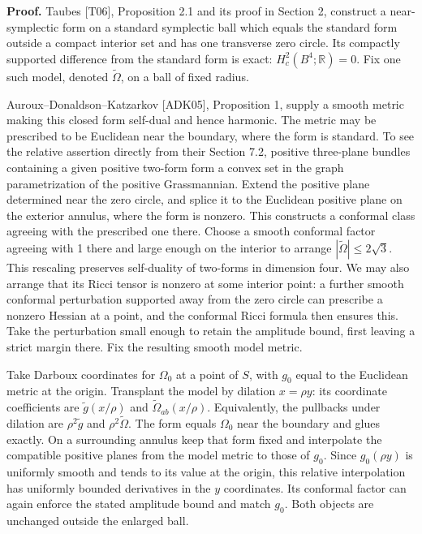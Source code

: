 \documentclass[
  11pt,
]{article}
\begin{document}
\textbf{Proof.} Taubes {[}T06{]}, Proposition 2.1 and its proof in
Section 2, construct a near-symplectic form on a standard symplectic
ball which equals the standard form outside a compact interior set and
has one transverse zero circle. Its compactly supported difference from
the standard form is exact: \(H_c^2(B^4;\mathbb R)=0\). Fix one such
model, denoted \(\widetilde\Omega\), on a ball of fixed radius.

Auroux--Donaldson--Katzarkov {[}ADK05{]}, Proposition 1, supply a smooth
metric making this closed form self-dual and hence harmonic. The metric
may be prescribed to be Euclidean near the boundary, where the form is
standard. To see the relative assertion directly from their Section 7.2,
positive three-plane bundles containing a given positive two-form form a
convex set in the graph parametrization of the positive Grassmannian.
Extend the positive plane determined near the zero circle, and splice it
to the Euclidean positive plane on the exterior annulus, where the form
is nonzero. This constructs a conformal class agreeing with the
prescribed one there. Choose a smooth conformal factor agreeing with 1
there and large enough on the interior to arrange
\(|\widetilde\Omega|\le2\sqrt3\). This rescaling preserves self-duality
of two-forms in dimension four. We may also arrange that its Ricci
tensor is nonzero at some interior point: a further smooth conformal
perturbation supported away from the zero circle can prescribe a nonzero
Hessian at a point, and the conformal Ricci formula then ensures this.
Take the perturbation small enough to retain the amplitude bound, first
leaving a strict margin there. Fix the resulting smooth model metric.

Take Darboux coordinates for \(\Omega_0\) at a point of \(S\), with
\(g_0\) equal to the Euclidean metric at the origin. Transplant the
model by dilation \(x=\rho y\): its coordinate coefficients are
\(\widetilde g(x/\rho)\) and \(\widetilde\Omega_{ab}(x/\rho)\).
Equivalently, the pullbacks under dilation are \(\rho^2\widetilde g\)
and \(\rho^2\widetilde\Omega\). The form equals \(\Omega_0\) near the
boundary and glues exactly. On a surrounding annulus keep that form
fixed and interpolate the compatible positive planes from the model
metric to those of \(g_0\). Since \(g_0(\rho y)\) is uniformly smooth
and tends to its value at the origin, this relative interpolation has
uniformly bounded derivatives in the \(y\) coordinates. Its conformal
factor can again enforce the stated amplitude bound and match \(g_0\).
Both objects are unchanged outside the enlarged ball.
\end{document}
